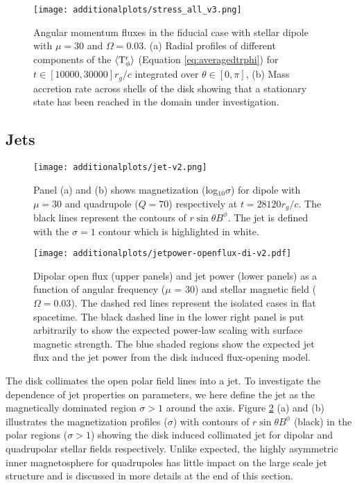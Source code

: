 \documentclass[fleqn,usenatbib]{mnras}
\begin{document}
\begin{figure}
   \centering
    \texttt{[image: additionalplots/stress\_all\_v3.png]}%
    \caption{
     Angular momentum fluxes in the fiducial case with stellar dipole with $\mu = 30$ and $\Omega = 0.03$.
    (a) Radial profiles of different components of the $\rm \langle T^r_{\phi} \rangle$ (Equation \ref{eq:averagedtrphi}) for $t \in [10000,30000]r_g/c$ integrated over $\theta \in [0,\pi]$, (b) Mass accretion rate across shells of the disk showing that a stationary state has been reached in the domain under investigation.}
    \label{fig:stress1d}
\end{figure}

\subsection{Jets}\label{sec:jets}
\begin{figure}
 \centering
 \texttt{[image: additionalplots/jet-v2.png]}
  \caption{Panel (a) and (b) shows magnetization (log$_{10}\sigma$) for dipole with $\mu = 30$ and quadrupole ($Q = 70$) respectively at $t = 28120 r_g/c$. The black lines represent the contours of $r \sin \theta B^{\phi}$. The jet is defined with the $\sigma = 1$ contour which is highlighted in white.} %
\label{fig:jetstructure}
\end{figure}

\begin{figure}
   \centering
    \texttt{[image: additionalplots/jetpower-openflux-di-v2.pdf]}
    \caption{Dipolar open flux (upper panels) and jet power (lower panels) as a function of angular frequency ($\mu$ = 30) and stellar magnetic field ($\Omega = 0.03$). The dashed red lines represent the isolated cases in flat spacetime. The black dashed line in the lower right panel is put arbitrarily to show the expected power-law scaling with surface magnetic strength. The blue shaded regions show the expected jet flux and the jet power from the disk induced flux-opening model.}
    \label{fig:jet-power-di}
\end{figure}
The disk collimates the open polar field lines into a jet. To investigate the dependence of jet properties on parameters, we here define the jet as the magnetically dominated region $\sigma>1$ around the axis. Figure \ref{fig:jetstructure} (a) and (b) illustrates the magnetization profiles ($\sigma$) with contours of $r \sin \theta B^{\phi}$ (black) in the polar regions ($\sigma > 1$) showing the disk induced collimated jet for dipolar and quadrupolar stellar fields respectively. Unlike expected, the highly asymmetric inner magnetosphere for quadrupoles has little impact on the large scale jet structure and is discussed in more details at the end of this section.
\end{document}
